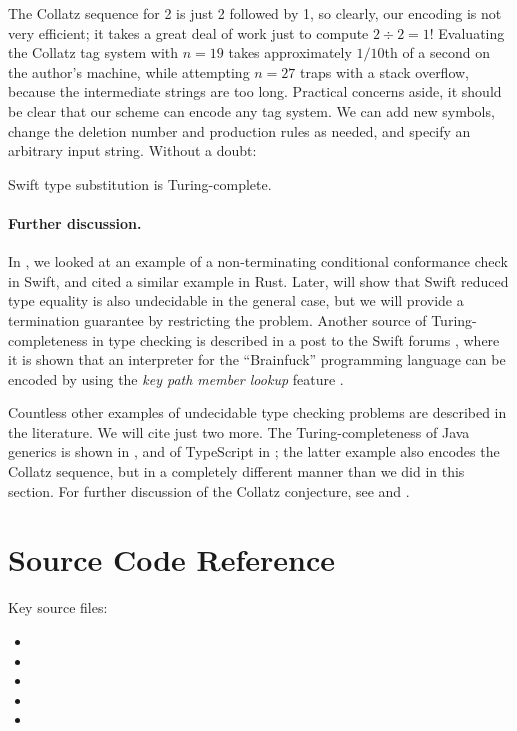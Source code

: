 \documentclass[../generics]{subfiles}
\begin{document}
The Collatz sequence for 2 is just 2 followed by 1, so clearly, our encoding is not very efficient; it takes a great deal of work just to compute $2\div 2 = 1$! Evaluating the Collatz tag system with $n=19$ takes approximately $1/10$th of a second on the author's machine, while attempting $n=27$ traps with a stack overflow, because the intermediate strings are too long. Practical concerns aside, it should be clear that our scheme can encode any tag system. We can add new symbols, change the deletion number and production rules as needed, and specify an arbitrary input string. Without a doubt:

\begin{theorem}
Swift type substitution is Turing-complete.
\end{theorem}

\paragraph{Further discussion.}
In , we looked at an example of a non-terminating conditional conformance check in Swift, and cited a similar example in Rust. Later,  will show that Swift reduced type equality is also undecidable in the general case, but we will provide a termination guarantee by restricting the problem.
Another source of Turing-completeness in type checking is described in a post to the Swift forums \cite{brainfuck}, where it is shown that an interpreter for the ``Brainfuck'' programming language can be encoded by using the \emph{key path member lookup} feature \cite{se0252}.

Countless other examples of undecidable type checking problems are described in the literature. We will cite just two more. The Turing-completeness of Java generics is shown in \cite{java_undecidable}, and of TypeScript in \cite{tscollatz}; the latter example also encodes the Collatz sequence, but in a completely different manner than we did in this section. For further discussion of the Collatz conjecture, see \cite{collatzbook} and \cite{wolframtag}.

\section{Source Code Reference}

Key source files:
\begin{itemize}
\item {}
\item {}
\item {}
\item {}
\item {}
\end{itemize}
\end{document}
